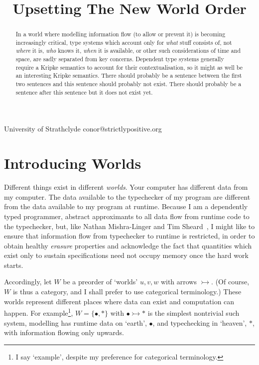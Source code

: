 \documentclass{sigplanconf}
\begin{document}
\title{Upsetting The New World Order}
           {University of Strathclyde}
           {conor@strictlypositive.org}
\maketitle

\begin{abstract}
  In a world where modelling information flow (to allow or prevent it)
  is becoming increasingly critical, type systems which account only
  for \emph{what} stuff consists of, not \emph{where} it is,
  \emph{who} knows it, \emph{when} it is available, or other such
  considerations of time and space, are sadly separated from key
  concerns.  Dependent type systems generally require a Kripke
  semantics to account for their contextualisation, so it might as
  well be an interesting Kripke semantics. There should probably be a
  sentence between the first two sentences and this sentence should
  probably not exist. There should probably be a sentence after this
  sentence but it does not exist yet.
\end{abstract}


\section{Introducing Worlds}

Different things exist in different \emph{worlds}. Your computer has
different data from my computer. The data available to the typechecker
of my program are different from the data available to my program at
runtime. Because I am a dependently typed programmer, abstract
approximants to all data flow from runtime code to the typechecker,
but, like Nathan Mishra-Linger and Tim
Sheard~\cite{DBLP:conf/fossacs/Mishra-LingerS08}, I might like to
ensure that information flow from typechecker to runtime is
restricted, in order to obtain healthy \emph{erasure} properties and
acknowledge the fact that quantities which exist only to sustain
specifications need not occupy memory once the hard work starts.

\newcommand{\wto}{\rightarrowtail}
\newcommand{\hb}{\!:\!}
\newcommand{\Ty}{\pentagram}
\newcommand{\earth}{\bullet}
\newcommand{\heaven}{\ast}
\newcommand{\tn}[1]{\vdash #1 \;}

Accordingly, let $W$ be a preorder of `worlds' $u,v,w$ with arrows
$\wto$. (Of course, $W$ is thus a category, and I shall prefer to use
categorical terminology.)  These worlds represent different places
where data can exist and computation can happen.  For
example\footnote{I say `example', despite my preference for
  categorical terminology.}, $W=\{\earth,\heaven\}$ with $\earth \wto
\heaven$ is the simplest nontrivial such system, modelling has runtime
data on `earth', $\earth$, and typechecking in `heaven', $\heaven$,
with information flowing only upwards.
\end{document}
